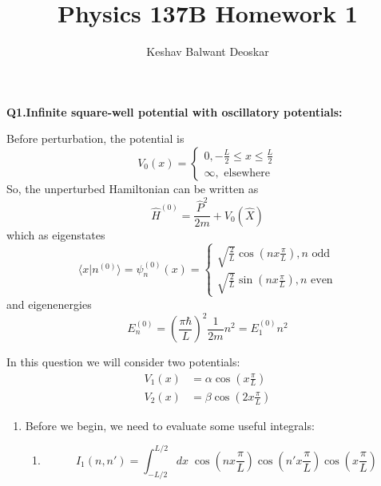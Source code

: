 \documentclass{article}
\title{Physics 137B Homework 1}
\author{Keshav Balwant Deoskar}
\newcommand{\inner}[2]{\langle #1 | #2 \rangle}
\begin{document}
\maketitle

\begin{dottedbox}
  \textbf{Q1.Infinite square-well potential with oscillatory potentials:} 

  \vskip 0.5cm
  Before perturbation, the potential is 
  \[ V_0(x) = \begin{cases}
    0, -\frac{L}{2} \leq x \leq \frac{L}{2} \\
    \infty, \text{  elsewhere}
  \end{cases} \]
  So, the unperturbed Hamiltonian can be written as 
  \[ \hat{H}^{(0)} = \frac{\hat{P}^2}{2m} + V_0(\hat{X}) \]
  which as eigenstates 
  \[ \inner{x}{n^{(0)}} = \psi_n^{(0)}(x) = \begin{cases}
    \sqrt{\frac{2}{L}} \cos(nx \frac{\pi}{L}), n \text{ odd} \\
    \sqrt{\frac{2}{L}} \sin(nx \frac{\pi}{L}), n \text{ even}
  \end{cases} \]  
  and eigenenergies
  \[ E_n^{(0)} = \left(\frac{\pi \hbar}{L}\right)^2 \frac{1}{2m}n^2 = E_1^{(0)}n^2\]

  In this question we will consider two potentials:
  \begin{align*}
    V_1(x) &= \alpha \cos \left( x \frac{\pi}{L} \right) \\
    V_2(x) &= \beta \cos \left( 2x \frac{\pi}{L} \right) 
  \end{align*}
\end{dottedbox}

\vskip 1cm
\begin{enumerate}[label=(\alph*)]
  \item Before we begin, we need to evaluate some useful integrals:
  \begin{enumerate}
    \item \[ I_1(n, n') = \int_{-L/2}^{L/2} dx\;\cos\left( nx\frac{\pi}{L} \right)\cos\left( n'x\frac{\pi}{L} \right)\cos\left( x\frac{\pi}{L} \right)\]
  \end{enumerate}
\end{enumerate}

\end{document}

